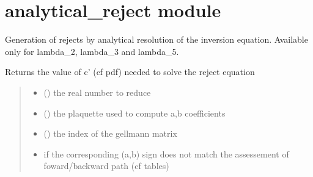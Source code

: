 \documentclass[letterpaper,10pt,english]{sphinxmanual}
\begin{document}
\section{analytical\_reject module}
\label{\detokenize{analytical_reject:module-analytical_reject}}\label{\detokenize{analytical_reject:analytical-reject-module}}\label{\detokenize{analytical_reject::doc}}
\sphinxAtStartPar
Generation of rejects by analytical resolution of the inversion equation. Available only for lambda\_2, lambda\_3 and lambda\_5.

\begin{fulllineitems}
\label{\detokenize{analytical_reject:analytical_reject.coeff_c}}
\pysigstartsignatures
\pysiglinewithargsret
{}
{\sphinxparamcomma {}\sphinxparamcomma {}}
{}
\pysigstopsignatures
\sphinxAtStartPar
Returns the value of c’ (cf pdf) needed to solve the reject equation
\begin{quote}\begin{description}
\begin{itemize}
\item {} 
\sphinxAtStartPar
{} () \textendash{} the real number to reduce

\item {} 
\sphinxAtStartPar
{} () \textendash{} the plaquette used to compute a,b coefficients

\item {} 
\sphinxAtStartPar
{} () \textendash{} the index of the gell\sphinxhyphen{}mann matrix

\end{itemize}

\begin{itemize}
\item {} 
\sphinxAtStartPar
{} \textendash{} if the corresponding (a,b) sign does not match the assessement of foward/backward path (cf tables)


\end{itemize}
\end{description}
\end{quote}
\end{fulllineitems}
\end{document}
